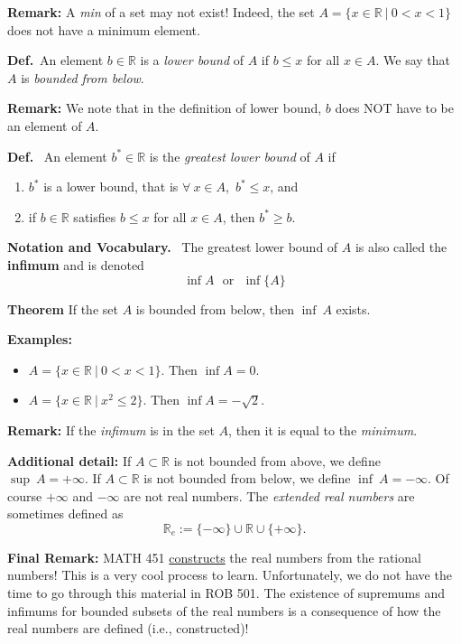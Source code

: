 \documentclass[letterpaper]{article}
\newcommand{\real}{\mathbb R}  %
\begin{document}
\noindent \textbf{Remark:} A \textit{min} of a set may not exist! Indeed, the set $A = \{  x\in \real~|~ 0  < x < 1\}$ does not have a minimum element.

\noindent \textbf{Def.}~An element $b\in \real$ is a \textit{lower  bound} of $A$ if $b\le x$ for all  $x\in A$.  We say that $A$  is \textit{bounded from below}.

\noindent \textbf{Remark:} We note that in the definition of lower bound,  $b$ does NOT have to be an element of $A$.

\noindent \textbf{Def.}~ An element $b^*\in \real$ is the \textit{greatest lower bound} of $A$ if
\vspace*{-.2in}
\begin{enumerate}
\item $b^*$ is a lower bound, that is $\forall ~x\in A$,~$b^* \le x$, and
\item  if $b\in \real$ satisfies $b\le x$ for all $x\in A$, then $b^* \ge b$.
\end{enumerate}

\textbf{Notation and Vocabulary.}~ The greatest lower bound of $A$ is also called the \textbf{infimum} and is denoted
$$\inf A~~~\mbox{or}~~~\inf\{A\}$$

\noindent \textbf{Theorem} If the set $A$ is bounded from below, then $\inf~A$ exists.

\noindent \textbf{Examples:}
\vspace*{-.2in}
\begin{itemize}
\item $A = \{  x\in \real~|~ 0  < x < 1\}$. Then $\inf A =0$.
\item $A= \{ x\in \real~|~ x^2 \le 2\}.$ Then  $\inf A =-\sqrt{2}$.
\end{itemize}

\noindent \textbf{Remark:} If the \textit{infimum} is in the set $A$, then it is equal to the \textit{minimum}.

\noindent \textbf{Additional detail:}  If $A\subset \real$ is not bounded from above, we define $\sup~A = +\infty$. If $A\subset \real$ is not bounded from below, we define $\inf~A = -\infty$. Of course $+\infty$ and $-\infty$ are not real numbers. The \textit{extended real numbers} are sometimes defined as
$$\real_e:=\{-\infty\} \cup \real \cup \{+\infty \}.$$

\noindent \textbf{Final Remark:} MATH 451 \underline{constructs} the real numbers from the rational numbers! This is a very cool process to learn. Unfortunately, we do not have the time to go through this material in ROB 501. The existence of supremums and infimums for bounded subsets of the real numbers is a consequence of how the real numbers are defined (i.e., constructed)! 
\end{document}
